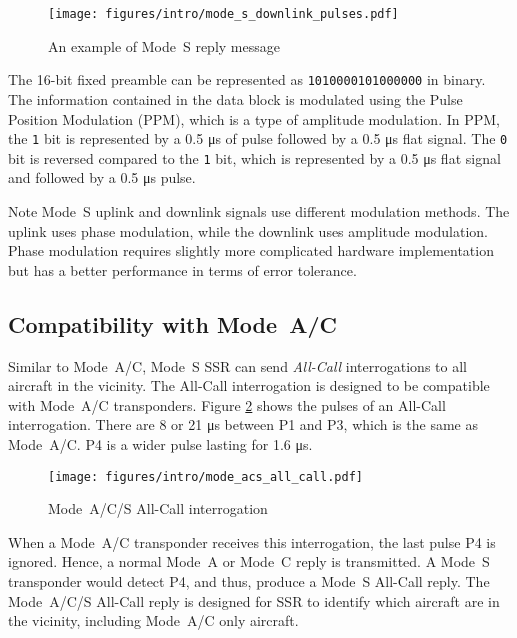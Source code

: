 \begin{figure}[ht]
  \texttt{[image: figures/intro/mode\_s\_downlink\_pulses.pdf]}
  \caption{An example of Mode~S reply message}
  \label{fig:mode_s_downlink_pulses}
\end{figure}

The 16-bit fixed preamble can be represented as \texttt{1010000101000000} in binary. The information contained in the data block is modulated using the Pulse Position Modulation (PPM), which is a type of amplitude modulation. In PPM, the \texttt{1} bit is represented by a 0.5 μs of pulse followed by a 0.5 μs flat signal. The \texttt{0} bit is reversed compared to the \texttt{1} bit, which is represented by a 0.5 μs flat signal and followed by a 0.5 μs pulse.

\begin{notebox}{Note}
  Mode~S uplink and downlink signals use different modulation methods. The uplink uses phase modulation, while the downlink uses amplitude modulation. Phase modulation requires slightly more complicated hardware implementation but has a better performance in terms of error tolerance. 
\end{notebox}

\subsection{Compatibility with Mode~A/C}

Similar to Mode~A/C, Mode~S SSR can send \emph{All-Call} interrogations to all aircraft in the vicinity. The All-Call interrogation is designed to be compatible with Mode~A/C transponders. Figure \ref{fig:mode_s_all_call} shows the pulses of an All-Call interrogation. There are 8 or 21 μs between P1 and P3, which is the same as Mode~A/C. P4 is a wider pulse lasting for 1.6 μs.

\begin{figure}[ht]
  \texttt{[image: figures/intro/mode\_acs\_all\_call.pdf]}
  \caption{Mode~A/C/S All-Call interrogation}
  \label{fig:mode_s_all_call}
\end{figure}

When a Mode~A/C transponder receives this interrogation, the last pulse P4 is ignored. Hence, a normal Mode~A or Mode~C reply is transmitted. A Mode~S transponder would detect P4, and thus, produce a Mode~S All-Call reply. The Mode~A/C/S All-Call reply is designed for SSR to identify which aircraft are in the vicinity, including Mode~A/C only aircraft.

